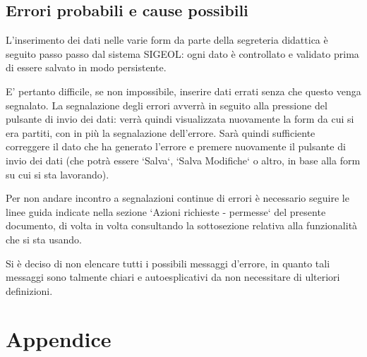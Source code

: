 \documentclass[11pt,a4paper]{article}
\begin{document}
\subsection{Errori probabili e cause possibili}
L'inserimento dei dati nelle varie form da parte della segreteria didattica è seguito passo passo dal sistema SIGEOL: ogni dato è controllato e validato prima di essere salvato in modo persistente.

E' pertanto difficile, se non impossibile, inserire dati errati senza che questo venga segnalato.
La segnalazione degli errori avverrà in seguito alla pressione del pulsante di invio dei dati: verrà quindi visualizzata nuovamente la form da cui si era partiti, con in più la segnalazione dell'errore. Sarà quindi sufficiente correggere il dato che ha generato l'errore e premere nuovamente il pulsante di invio dei dati (che potrà essere `Salva`, `Salva Modifiche` o altro, in base alla form su cui si sta lavorando).

Per non andare incontro a segnalazioni continue di errori è necessario seguire le linee guida indicate nella sezione `Azioni richieste - permesse` del presente documento, di volta in volta consultando la sottosezione relativa alla funzionalità che si sta usando.

Si è deciso di non elencare tutti i possibili messaggi d'errore, in quanto tali messaggi sono talmente chiari e autoesplicativi da non necessitare di ulteriori definizioni.
\newpage
\section{Appendice}
\end{document}
